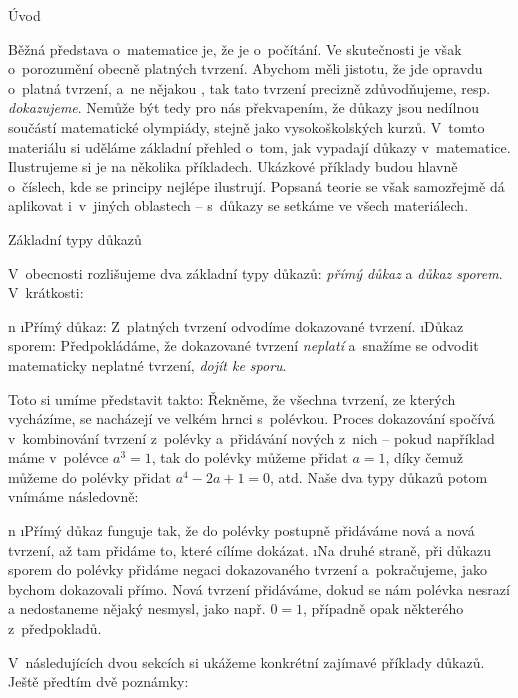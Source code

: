 





\sec Úvod

Běžná představa o~matematice je, že je o~počítání. Ve skutečnosti je však o~porozumění obecně platných tvrzení. Abychom měli jistotu, že jde opravdu o~platná tvrzení, a~ne nějakou , tak tato tvrzení precizně zdůvodňujeme, resp. \textit{dokazujeme}. Nemůže být tedy pro nás překvapením, že důkazy jsou nedílnou součástí matematické olympiády, stejně jako vysokoškolských kurzů. V~tomto materiálu si uděláme základní přehled o~tom, jak vypadají důkazy v~matematice. Ilustrujeme si je na několika příkladech. Ukázkové příklady budou hlavně o~číslech, kde se principy nejlépe ilustrují. Popsaná teorie se však samozřejmě dá aplikovat i~v~jiných oblastech -- s~důkazy se setkáme ve všech materiálech.

\sec Základní typy důkazů

V~obecnosti rozlišujeme dva základní typy důkazů: \textit{přímý důkaz} a \textit{důkaz sporem}. V~krátkosti:

\begitems \style n
\i Přímý důkaz: Z~platných tvrzení odvodíme dokazované tvrzení. 
\i Důkaz sporem: Předpokládáme, že dokazované tvrzení \textit{neplatí} a~snažíme se odvodit matematicky neplatné tvrzení, \textit{dojít ke sporu}.
\enditems 

Toto si umíme představit takto: Řekněme, že všechna tvrzení, ze kterých vycházíme, se nacházejí ve velkém hrnci s~polévkou. Proces dokazování spočívá v~kombinování tvrzení z~polévky a~přidávání nových z~nich -- pokud například máme v~polévce $a^3=1$, tak do polévky můžeme přidat $a=1$, díky čemuž můžeme do polévky přidat $a^4-2a+1=0$, atd. Naše dva typy důkazů potom vnímáme následovně:

\begitems \style n
\i Přímý důkaz funguje tak, že do polévky postupně přidáváme nová a nová tvrzení, až tam přidáme to, které cílíme dokázat.
\i Na druhé straně, při důkazu sporem do polévky přidáme negaci dokazovaného tvrzení a~pokračujeme, jako bychom dokazovali přímo. Nová tvrzení přidáváme, dokud se nám polévka nesrazí a nedostaneme nějaký nesmysl, jako např. $0=1$, případně opak některého z~předpokladů.
\enditems

V~následujících dvou sekcích si ukážeme konkrétní zajímavé příklady důkazů. Ještě předtím dvě poznámky:

